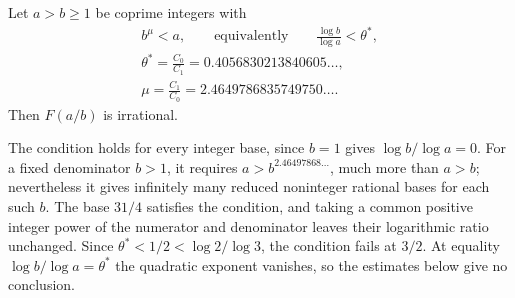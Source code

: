 \documentclass[11pt]{article}
\begin{document}
\begin{theorem}
\label{res:rational-base-threshold}
Let $a>b\ge1$ be coprime integers with
\[
\begin{gathered}
 b^{\mu}<a,\qquad\text{equivalently}\qquad
 \frac{\log b}{\log a}<\theta^*,\\
 \theta^*=\frac{C_0}{C_1}=0.4056830213840605\ldots,\\
 \mu=\frac{C_1}{C_0}=2.4649786835749750\ldots.
\end{gathered}
\]
Then $F(a/b)$ is irrational.
\end{theorem}

\noindent The condition holds for every integer base, since $b=1$ gives
$\log b/\log a=0$. For a fixed denominator $b>1$, it requires
$a>b^{2.46497868\ldots}$, much more than $a>b$; nevertheless it gives
infinitely many reduced noninteger rational bases for each such $b$.
The base $31/4$ satisfies the condition, and taking a common positive
integer power of the numerator and denominator leaves their logarithmic
ratio unchanged. Since $\theta^*<1/2<\log2/\log3$, the condition fails at $3/2$.
At equality $\log b/\log a=\theta^*$ the quadratic exponent vanishes,
so the estimates below give no conclusion.
\end{document}
